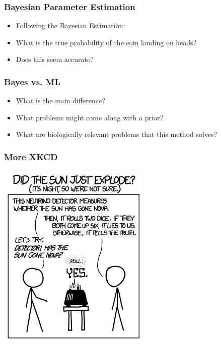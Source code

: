 \documentclass[14pt,handout]{beamer}
\begin{document}
\begin{frame}
\frametitle{Bayesian Parameter Estimation}
\begin{itemize}
	\item<+-> Following the Bayesian Estimation:
	\item<+-> What is the true probability of the coin landing on heads?
	\item<+-> Does this seem accurate?
\end{itemize}
\end{frame}

\begin{frame}
\frametitle{Bayes vs. ML}
\begin{itemize}
	\item<+-> What is the main difference?
	\item<+-> What problems might come along with a prior?
	\item<+-> What are biologically relevant problems that this method solves?
\end{itemize}
\end{frame}

\begin{frame}
\frametitle{More XKCD}
	\begin{center}
	\includegraphics[width=0.55\textwidth]{images_20171130_xkcd1.png}
	\end{center}
\end{frame}
\end{document}
